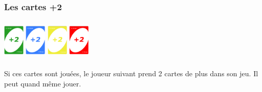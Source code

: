 \documentclass[french]{article}
\begin{document}
\subsubsection{Les cartes +2}
\begin{center}
	\centering
	\includegraphics[width=1cm, height=2cm]{22v}
	\includegraphics[width=1cm, height=2cm]{22b}
	\includegraphics[width=1cm, height=2cm]{22j}
	\includegraphics[width=1cm, height=2cm]{22r}
\end{center}
Si ces cartes sont jouées, le joueur suivant prend 2 cartes de plus dans son jeu. Il peut quand même jouer.
\end{document}
